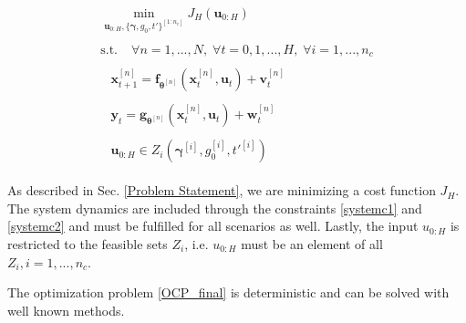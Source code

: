 \begin{subequations}
\begin{align}
\begin{split}
\min\limits_{\boldsymbol{u}_{0:H}, \{ \boldsymbol{\gamma}, g_0, t' \}^{[1:n_c]} }  J_H(\boldsymbol{u}_{0:H})
\end{split}\\
\begin{split}
\text{s.t.}\; &\forall n = 1,...,N, \;  \forall t = 0,1,...,H,\; \forall i = 1,...,n_c
\end{split}\\
\begin{split}\label{systemc1}
&\boldsymbol{x}_{t+1}^{[n]} = \boldsymbol{f}_{\boldsymbol{\theta}^{[n]}} \left( \boldsymbol{x}_{t}^{[n]} , \boldsymbol{u}_t \right) + \boldsymbol{v}_{t}^{[n]}
\end{split}\\
\begin{split}\label{systemc2}
&\boldsymbol{y}_{t} = \boldsymbol{g}_{\boldsymbol{\theta}^{[n]}} \left( \boldsymbol{x}_{t}^{[n]}, \boldsymbol{u}_t \right) + \boldsymbol{w}_{t}^{[n]}
\end{split}\\
\begin{split}
 &\boldsymbol{u}_{0:H} \in Z_i(\boldsymbol{\gamma}^{[i]}, g_0^{[i]}, t'^{[i]})
\end{split}
\end{align}
\label{OCP_final}
\end{subequations}

As described in Sec. \ref{Problem Statement}, we are minimizing a cost function $J_H$. The system dynamics are included through the constraints \eqref{systemc1} and \eqref{systemc2} and must be fulfilled for all scenarios as well. Lastly, the input $u_{0:H}$ is restricted to the feasible sets $Z_i$, i.e. $u_{0:H}$ must be an element of all $Z_i, i = 1,...,n_c$.

The optimization problem \eqref{OCP_final} is deterministic and can be solved with well known methods. 




